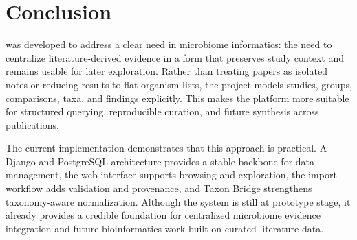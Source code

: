 \section{Conclusion}

\projectname{} was developed to address a clear need in microbiome informatics: the need to centralize literature-derived evidence in a form that preserves study context and remains usable for later exploration. Rather than treating papers as isolated notes or reducing results to flat organism lists, the project models studies, groups, comparisons, taxa, and findings explicitly. This makes the platform more suitable for structured querying, reproducible curation, and future synthesis across publications.

The current implementation demonstrates that this approach is practical. A Django and PostgreSQL architecture provides a stable backbone for data management, the web interface supports browsing and exploration, the import workflow adds validation and provenance, and Taxon Bridge strengthens taxonomy-aware normalization. Although the system is still at prototype stage, it already provides a credible foundation for centralized microbiome evidence integration and future bioinformatics work built on curated literature data.
